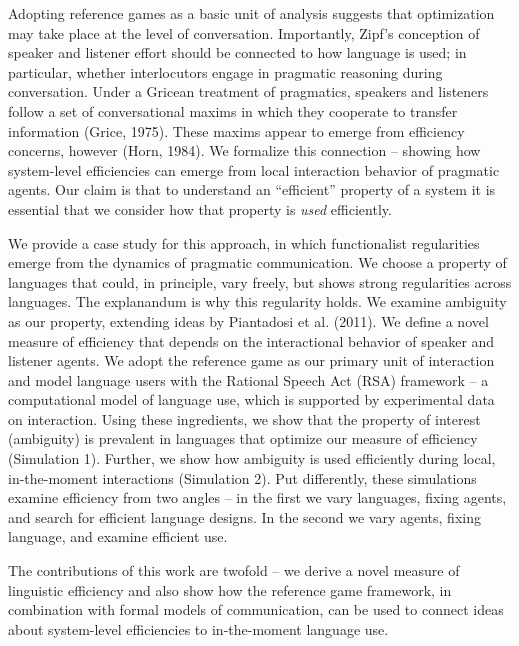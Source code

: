 \documentclass[10pt, letterpaper]{article}
\begin{document}
Adopting reference games as a basic unit of analysis suggests that
optimization may take place at the level of conversation. Importantly,
Zipf's conception of speaker and listener effort should be connected to
how language is used; in particular, whether interlocutors engage in
pragmatic reasoning during conversation. Under a Gricean treatment of
pragmatics, speakers and listeners follow a set of conversational maxims
in which they cooperate to transfer information (Grice, 1975). These
maxims appear to emerge from efficiency concerns, however (Horn, 1984).
We formalize this connection -- showing how system-level efficiencies
can emerge from local interaction behavior of pragmatic agents. Our
claim is that to understand an ``efficient'' property of a system it is
essential that we consider how that property is \emph{used}
efficiently.\par

We provide a case study for this approach, in which functionalist
regularities emerge from the dynamics of pragmatic communication. We
choose a property of languages that could, in principle, vary freely,
but shows strong regularities across languages. The explanandum is why
this regularity holds. We examine ambiguity as our property, extending
ideas by Piantadosi et al. (2011). We define a novel measure of
efficiency that depends on the interactional behavior of speaker and
listener agents. We adopt the reference game as our primary unit of
interaction and model language users with the Rational Speech Act (RSA)
framework -- a computational model of language use, which is supported
by experimental data on interaction. Using these ingredients, we show
that the property of interest (ambiguity) is prevalent in languages that
optimize our measure of efficiency (Simulation 1). Further, we show how
ambiguity is used efficiently during local, in-the-moment interactions
(Simulation 2). Put differently, these simulations examine efficiency
from two angles -- in the first we vary languages, fixing agents, and
search for efficient language designs. In the second we vary agents,
fixing language, and examine efficient use. \par

The contributions of this work are twofold -- we derive a novel measure
of linguistic efficiency and also show how the reference game framework,
in combination with formal models of communication, can be used to
connect ideas about system-level efficiencies to in-the-moment language
use.\par
\end{document}

